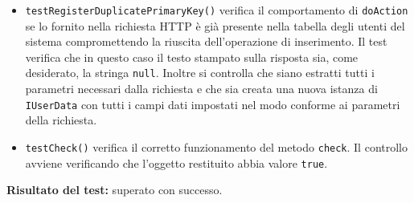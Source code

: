 \begin{itemize}
\begin{itemize}
\item \texttt{testRegisterDuplicatePrimaryKey()}
verifica il comportamento di \texttt{doAction} se lo  fornito nella richiesta HTTP è già presente nella tabella degli utenti del sistema compromettendo la riuscita dell'operazione di inserimento. Il test verifica che in questo caso il testo stampato sulla risposta sia, come desiderato, la stringa \texttt{null}. Inoltre si controlla che siano estratti tutti i parametri necessari dalla richiesta e che sia creata una nuova istanza di \texttt{IUserData} con tutti i campi dati impostati nel modo conforme ai parametri della richiesta.

\item \texttt{testCheck()} verifica il corretto funzionamento del metodo \texttt{check}. Il controllo avviene verificando che l'oggetto restituito abbia valore \texttt{true}.
 
\end{itemize}

\textbf{Risultato del test:} superato con successo.

\end{itemize}

